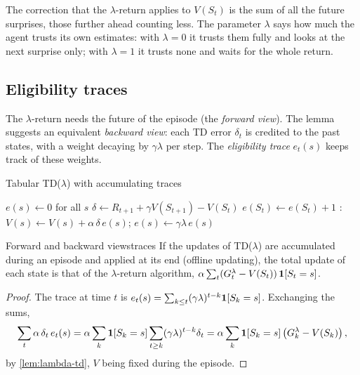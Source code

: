\begin{intuition}
  The correction that the $\lambda$-return applies to $V(S_t)$ is the sum
  of all the future surprises, those further ahead counting less. The
  parameter $\lambda$ says how much the agent trusts its own estimates:
  with $\lambda = 0$ it trusts them fully and looks at the next surprise
  only; with $\lambda = 1$ it trusts none and waits for the whole return.
\end{intuition}

\subsection{Eligibility traces}

The $\lambda$-return needs the future of the episode (the \emph{forward
view}). The lemma suggests an equivalent \emph{backward view}: each TD
error $\delta_t$ is credited to the past states, with a weight decaying by
$\gamma \lambda$ per step. The \emph{eligibility trace} $e_t(s)$ keeps
track of these weights.

\begin{algobox}{Tabular TD($\lambda$) with accumulating traces}
  \begin{algorithmic}[1]
      \State $e(s) \gets 0$ for all $s$
        \State $\delta \gets R_{t+1} + \gamma V(S_{t+1}) - V(S_t)$
        \State $e(S_t) \gets e(S_t) + 1$
        : $V(s) \gets V(s) + \alpha\, \delta\, e(s)$;\quad
          $e(s) \gets \gamma \lambda\, e(s)$
        \EndFor
      \EndFor
    \EndFor
  \end{algorithmic}
\end{algobox}

\begin{proposition}{Forward and backward views}{traces}
  If the updates of TD($\lambda$) are accumulated during an episode and
  applied at its end (offline updating), the total update of each state is
  that of the $\lambda$-return algorithm, $\alpha \sum_t (G_t^\lambda -
  V(S_t))\, \mathbf{1}[S_t = s]$.
\end{proposition}

\begin{proof}
  The trace at time $t$ is $e_t(s) = \sum_{k \leq t} (\gamma
  \lambda)^{t-k} \mathbf{1}[S_k = s]$. Exchanging the sums,
  \begin{equation*}
    \sum_t \alpha\, \delta_t\, e_t(s) = \alpha \sum_k \mathbf{1}[S_k =
    s] \sum_{t \geq k} (\gamma \lambda)^{t-k} \delta_t = \alpha \sum_k
    \mathbf{1}[S_k = s] \left( G_k^\lambda - V(S_k) \right),
  \end{equation*}
  by \cref{lem:lambda-td}, $V$ being fixed during the episode.
\end{proof}

